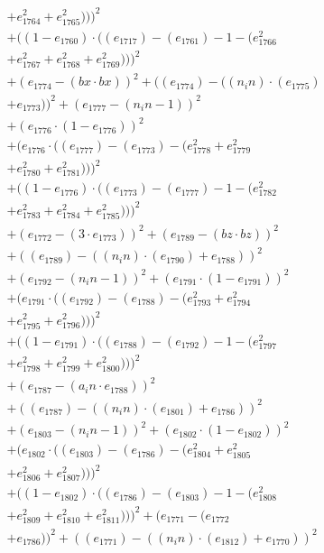 \documentclass[10pt, a4paper]{article}
\begin{document}
\begin{align*}
& + e_{1764}^{2} + e_{1765}^{2})))^{2} \\
& + ((1 - e_{1760})  \cdot  ((e_{1717}) - (e_{1761}) - 1 - (e_{1766}^{2} \\
& + e_{1767}^{2} + e_{1768}^{2} + e_{1769}^{2})))^{2} \\
& + (e_{1774} - (bx  \cdot  bx))^{2} + ((e_{1774}) - ((n_in)  \cdot  (e_{1775}) \\
& + e_{1773}))^{2} + (e_{1777} - (n_in - 1))^{2} \\
& + (e_{1776}  \cdot  (1 - e_{1776}))^{2} \\
& + (e_{1776}  \cdot  ((e_{1777}) - (e_{1773}) - (e_{1778}^{2} + e_{1779}^{2} \\
& + e_{1780}^{2} + e_{1781}^{2})))^{2} \\
& + ((1 - e_{1776})  \cdot  ((e_{1773}) - (e_{1777}) - 1 - (e_{1782}^{2} \\
& + e_{1783}^{2} + e_{1784}^{2} + e_{1785}^{2})))^{2} \\
& + (e_{1772} - (3  \cdot  e_{1773}))^{2} + (e_{1789} - (bz  \cdot  bz))^{2} \\
& + ((e_{1789}) - ((n_in)  \cdot  (e_{1790}) + e_{1788}))^{2} \\
& + (e_{1792} - (n_in - 1))^{2} + (e_{1791}  \cdot  (1 - e_{1791}))^{2} \\
& + (e_{1791}  \cdot  ((e_{1792}) - (e_{1788}) - (e_{1793}^{2} + e_{1794}^{2} \\
& + e_{1795}^{2} + e_{1796}^{2})))^{2} \\
& + ((1 - e_{1791})  \cdot  ((e_{1788}) - (e_{1792}) - 1 - (e_{1797}^{2} \\
& + e_{1798}^{2} + e_{1799}^{2} + e_{1800}^{2})))^{2} \\
& + (e_{1787} - (a_in  \cdot  e_{1788}))^{2} \\
& + ((e_{1787}) - ((n_in)  \cdot  (e_{1801}) + e_{1786}))^{2} \\
& + (e_{1803} - (n_in - 1))^{2} + (e_{1802}  \cdot  (1 - e_{1802}))^{2} \\
& + (e_{1802}  \cdot  ((e_{1803}) - (e_{1786}) - (e_{1804}^{2} + e_{1805}^{2} \\
& + e_{1806}^{2} + e_{1807}^{2})))^{2} \\
& + ((1 - e_{1802})  \cdot  ((e_{1786}) - (e_{1803}) - 1 - (e_{1808}^{2} \\
& + e_{1809}^{2} + e_{1810}^{2} + e_{1811}^{2})))^{2} + (e_{1771} - (e_{1772} \\
& + e_{1786}))^{2} + ((e_{1771}) - ((n_in)  \cdot  (e_{1812}) + e_{1770}))^{2} \\

\end{align*}
\end{document}
